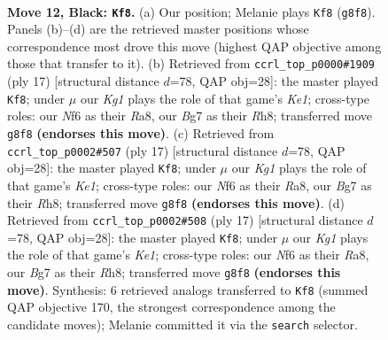 \documentclass[11pt]{article}
\begin{document}
\clearpage

\begin{figure}[p]\centering
\begin{subfigure}{0.46\textwidth}\centering
\resizebox{\linewidth}{!}{%
\newchessgame
\chessboard[
  setfen={rn1r2k1/pp3pbp/2p2np1/1P2p2b/P3P2P/2N2N2/2P1BPP1/R1B2RK1 b - - 0 12},
  showmover=false,
  pgfstyle=straightmove, color=movearrow, markmove={g8-f8}
]}
\caption{}
\end{subfigure}\hfill
\begin{subfigure}{0.46\textwidth}\centering
\resizebox{\linewidth}{!}{%
\newchessgame
\chessboard[
  setfen={r3k2r/pbpnbppp/1p2pn2/1N1p2B1/2PP4/P4N2/1P2PPPP/R3KB1R b KQkq - 1 9},
  showmover=false,
  pgfstyle=straightmove, color=movearrow, markmove={e8-f8}
]}
\caption{}
\end{subfigure}
\\[4pt]
\begin{subfigure}{0.46\textwidth}\centering
\resizebox{\linewidth}{!}{%
\newchessgame
\chessboard[
  setfen={r3k2r/pbpnbppp/1p2pn2/1N1p2B1/2PP4/P4N2/1P2PPPP/R3KB1R b KQkq - 1 9},
  showmover=false,
  pgfstyle=straightmove, color=movearrow, markmove={e8-f8}
]}
\caption{}
\end{subfigure}\hfill
\begin{subfigure}{0.46\textwidth}\centering
\resizebox{\linewidth}{!}{%
\newchessgame
\chessboard[
  setfen={r3k2r/pbpnbppp/1p2pn2/1N1p2B1/2PP4/P4N2/1P2PPPP/R3KB1R b KQkq - 1 9},
  showmover=false,
  pgfstyle=straightmove, color=movearrow, markmove={e8-f8}
]}
\caption{}
\end{subfigure}
\caption{\textbf{Move 12, Black: \texttt{Kf8}.} (a) Our position; Melanie plays \texttt{Kf8} (\texttt{g8f8}). Panels (b)--(d) are the retrieved master positions whose correspondence most drove this move (highest QAP objective among those that transfer to it). (b) Retrieved from \texttt{ccrl\_top\_p0000\#1909} (ply 17) [structural distance $d$=78, QAP obj=28]: the master played \texttt{Kf8}; under $\mu$ our \emph{Kg1} plays the role of that game's \emph{Ke1}; cross-type roles: our \emph{N}f6 as their \emph{R}a8, our \emph{B}g7 as their \emph{R}h8; transferred move \texttt{g8f8} \textbf{(endorses this move)}. (c) Retrieved from \texttt{ccrl\_top\_p0002\#507} (ply 17) [structural distance $d$=78, QAP obj=28]: the master played \texttt{Kf8}; under $\mu$ our \emph{Kg1} plays the role of that game's \emph{Ke1}; cross-type roles: our \emph{N}f6 as their \emph{R}a8, our \emph{B}g7 as their \emph{R}h8; transferred move \texttt{g8f8} \textbf{(endorses this move)}. (d) Retrieved from \texttt{ccrl\_top\_p0002\#508} (ply 17) [structural distance $d$=78, QAP obj=28]: the master played \texttt{Kf8}; under $\mu$ our \emph{Kg1} plays the role of that game's \emph{Ke1}; cross-type roles: our \emph{N}f6 as their \emph{R}a8, our \emph{B}g7 as their \emph{R}h8; transferred move \texttt{g8f8} \textbf{(endorses this move)}. Synthesis: 6 retrieved analogs transferred to \texttt{Kf8} (summed QAP objective 170, the strongest correspondence among the candidate moves); Melanie committed it via the \texttt{search} selector.}
\label{fig:thought-m23}
\end{figure}
\end{document}
